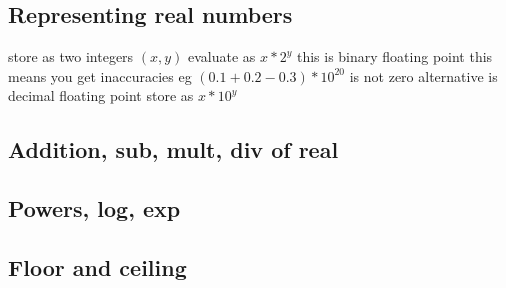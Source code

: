 
\subsection{Representing real numbers}

store as two integers \((x,y)\)
evaluate as \(x*2^y\)
this is binary floating point
this means you get inaccuracies
eg \((0.1+0.2-0.3)*10^20\) is not zero
alternative is decimal floating point
store as \(x*10^y\)
\subsection{Addition, sub, mult, div of real}

\subsection{Powers, log, exp}

\subsection{Floor and ceiling}

